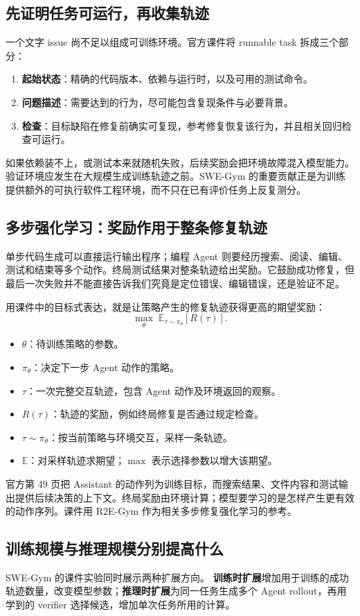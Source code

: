 \documentclass[11pt,a4paper]{article}
\begin{document}
\subsection{先证明任务可运行，再收集轨迹}
一个文字 issue 尚不足以组成可训练环境。官方课件将 runnable task 拆成三个部分：
\begin{enumerate}
\item \textbf{起始状态}：精确的代码版本、依赖与运行时，以及可用的测试命令。
\item \textbf{问题描述}：需要达到的行为，尽可能包含复现条件与必要背景。
\item \textbf{检查}：目标缺陷在修复前确实可复现，参考修复恢复该行为，并且相关回归检查可运行。
\end{enumerate}
如果依赖装不上，或测试本来就随机失败，后续奖励会把环境故障混入模型能力。验证环境应发生在大规模生成训练轨迹之前。SWE-Gym 的重要贡献正是为训练提供额外的可执行软件工程环境，而不只在已有评价任务上反复测分。

\subsection{多步强化学习：奖励作用于整条修复轨迹}
单步代码生成可以直接运行输出程序；编程 Agent 则要经历搜索、阅读、编辑、测试和结束等多个动作。终局测试结果对整条轨迹给出奖励。它鼓励成功修复，但最后一次失败并不能直接告诉我们究竟是定位错误、编辑错误，还是验证不足。

用课件中的目标式表达，就是让策略产生的修复轨迹获得更高的期望奖励：
$$
\max_{\theta}\;\mathbb{E}_{\tau\sim\pi_\theta}[R(\tau)].
$$
\begin{itemize}
\item $\theta$：待训练策略的参数。
\item $\pi_\theta$：决定下一步 Agent 动作的策略。
\item $\tau$：一次完整交互轨迹，包含 Agent 动作及环境返回的观察。
\item $R(\tau)$：轨迹的奖励，例如终局修复是否通过规定检查。
\item $\tau\sim\pi_\theta$：按当前策略与环境交互，采样一条轨迹。
\item $\mathbb{E}$：对采样轨迹求期望；$\max$ 表示选择参数以增大该期望。
\end{itemize}
官方第 49 页把 Assistant 的动作列为训练目标，而搜索结果、文件内容和测试输出提供后续决策的上下文。终局奖励由环境计算；模型要学习的是怎样产生更有效的动作序列。课件用 R2E-Gym 作为相关多步修复强化学习的参考。

\subsection{训练规模与推理规模分别提高什么}
SWE-Gym 的课件实验同时展示两种扩展方向。
\textbf{训练时扩展}增加用于训练的成功轨迹数量，改变模型参数；\textbf{推理时扩展}为同一任务生成多个 Agent rollout，再用学到的 verifier 选择候选，增加单次任务所用的计算。
\end{document}
